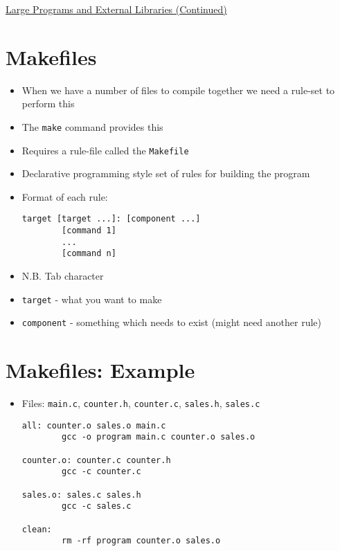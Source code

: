\documentclass{article}
\begin{document}
\begin{center}
	\underline{\huge Large Programs and External Libraries (Continued)}
\end{center}



\section{Makefiles}
\begin{itemize}
\item When we have a number of files to compile together we need a rule-set to perform this
\item The \verb!make! command provides this
\item Requires a rule-file called the \verb!Makefile!
\item Declarative programming style set of rules for building the program
\item Format of each rule:
\begin{verbatim}
target [target ...]: [component ...]
        [command 1]
        ...
        [command n]
\end{verbatim}
\item N.B. Tab character
\item \verb!target! - what you want to make
\item \verb!component! - something which needs to exist (might need another rule)
\end{itemize}



\section{Makefiles: Example}
\begin{itemize}
\item Files: \verb!main.c!, \verb!counter.h!, \verb!counter.c!, \verb!sales.h!, \verb!sales.c!

\begin{verbatim}
all: counter.o sales.o main.c
        gcc -o program main.c counter.o sales.o

counter.o: counter.c counter.h
        gcc -c counter.c

sales.o: sales.c sales.h
        gcc -c sales.c

clean:
        rm -rf program counter.o sales.o
\end{verbatim}
\end{itemize}
\end{document}
